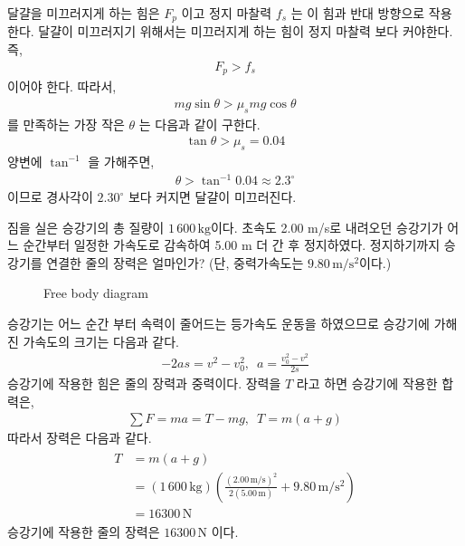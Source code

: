 \documentclass[floatfix,nofootinbib,superscriptaddress,fleqn]{revtex4-2}
\begin{document}
달걀을 미끄러지게 하는 힘은 $F_p$ 이고 정지 마찰력 $f_s$ 는 이 힘과 반대 방향으로
작용한다. 달걀이 미끄러지기 위해서는 미끄러지게 하는 힘이 정지 마찰력 보다 커야한다. 즉,
\begin{align}
  F_p > f_s
\end{align}
이어야 한다. 따라서,
\begin{align}
  mg\sin{\theta}  > \mu_s mg\cos{\theta}
\end{align}
를 만족하는 가장 작은 $\theta$ 는 다음과 같이 구한다.
\begin{align}
  \tan{\theta} > \mu_s = 0.04
\end{align}
양변에 $\tan^{-1}$ 을 가해주면,
  \begin{align}
  \theta > \tan^{-1}{0.04} \approx 2.3^\circ
\end{align}
이므로 경사각이 $2.30^\circ$ 보다 커지면 달걀이 미끄러진다.
\vspace{2cm}

짐을 실은 승강기의 총 질량이 
$1\,600\,\mathrm{kg}$이다. 초속도 2.00 m/s로 내려오던 승강기가 어느
순간부터 일정한 가속도로 감속하여 5.00 m 더 간 후
정지하였다. 정지하기까지 승강기를 연결한 줄의 장력은 얼마인가? (단,
중력가속도는 $9.80\,\mathrm{m/s^2}$이다.)   \\

\begin{figure}[htp]
   \caption{Free body diagram}
\end{figure}
승강기는 어느 순간 부터 속력이 줄어드는 등가속도 운동을 하였으므로
 승강기에 가해진 가속도의 크기는 다음과 같다.
\begin{align}
  -2as = v^2-v_0^2,\,\,\, a = \frac{v_0^2-v^2}{2s}
\end{align}
승강기에 작용한 힘은 줄의 장력과 중력이다. 장력을 $T$ 라고 하면
 승강기에 작용한 합력은,
\begin{align}
  \sum F = ma = T-mg,\,\,\, T = m(a+g)
\end{align}
따라서 장력은 다음과 같다.
\begin{align}
  \begin{split}
    T  &= m(a+g)  \\ 
    &= (1\,600\,\mathrm{kg})\left(\frac{(2.00\,\mathrm{m/s})^2}
    {2(5.00\,\mathrm{m})}+9.80\,\mathrm{m/s^2}\right) \\
    &=16300\,\mathrm{N}
  \end{split}
\end{align}
승강기에 작용한 줄의 장력은 $16300\,\mathrm{N}$ 이다.
\end{document}
